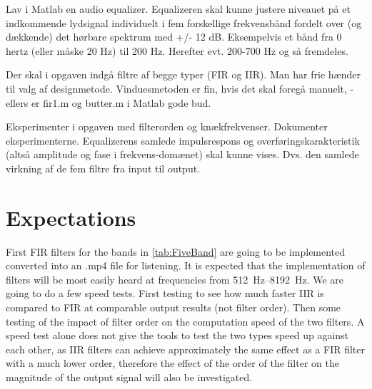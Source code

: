 Lav i Matlab en audio equalizer. Equalizeren skal kunne justere niveauet på et indkommende lydsignal individuelt i fem forskellige frekvensbånd fordelt over (og dækkende) det hørbare spektrum med +/- 12 dB. Eksempelvis et bånd fra 0 hertz (eller måske 20 Hz) til 200 Hz. Herefter evt. 200-700 Hz og så fremdeles.

Der skal i opgaven indgå filtre af begge typer (FIR og IIR). Man har frie hænder til valg af designmetode. Vinduesmetoden er fin, hvis det skal foregå manuelt, - ellers er fir1.m og butter.m i Matlab gode bud.

Eksperimenter i opgaven med filterorden og knækfrekvenser. Dokumenter eksperimenterne. Equalizerens samlede impulsrespons og overføringskarakteristik (altså amplitude og fase i frekvens-domænet) skal kunne vises. Dvs. den samlede virkning af de fem filtre fra input til output.

\section{Expectations}
\label{sec:expectations}

First FIR filters for the bands in \cref{tab:FiveBand} are going to be implemented converted into an .mp4 file for listening. It is expected that the implementation of filters will be most easily heard at frequencies from \SIrange{512}{8192}{\hertz}.
We are going to do a few speed tests. First testing to see how much faster IIR is compared to FIR at comparable output results (not filter order). Then some testing of the impact of filter order on the computation speed of the two filters.
A speed test alone does not give the tools to test the two types speed up against each other, as IIR filters can achieve approximately the same effect as a FIR filter with a much lower order, therefore the effect of the order of the filter on the magnitude of the output signal will also be investigated.
